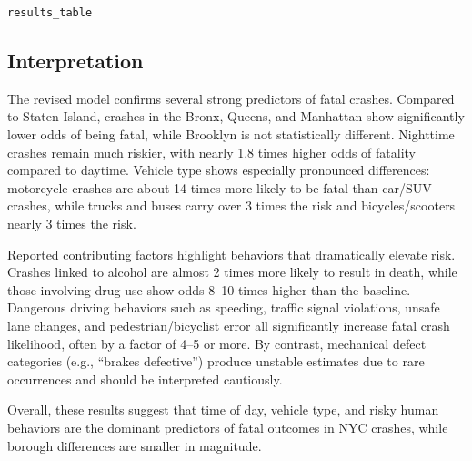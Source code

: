\documentclass[10pt]{article}\usepackage[]{graphicx}\usepackage[]{xcolor}
\makeatletter
\newcommand{\hldef}[1]{\textcolor[rgb]{0.345,0.345,0.345}{#1}}%
\newenvironment{kframe}{%
 \def\at@end@of@kframe{}%
 \ifinner\ifhmode%
  \def\at@end@of@kframe{\end{minipage}}%
  \begin{minipage}{\columnwidth}%
 \fi\fi%
 \def\FrameCommand##1{\hskip\@totalleftmargin \hskip-\fboxsep
 \colorbox{shadecolor}{##1}\hskip-\fboxsep
     \hskip-\linewidth \hskip-\@totalleftmargin \hskip\columnwidth}%
 \MakeFramed {\advance\hsize-\width
   \@totalleftmargin\z@ \linewidth\hsize
   \@setminipage}}%
 {\par\unskip\endMakeFramed%
 \at@end@of@kframe}
\newenvironment{knitrout}{}{} %
\makeatother
\begin{document}
\begin{knitrout}
\begin{kframe}
{\ttfamily\noindent\bfseries\color{errorcolor}{\#\# Error: object 'results\_table' not found}}\begin{alltt}
\hldef{results_table}
\end{alltt}


{\ttfamily\noindent\bfseries\color{errorcolor}{\#\# Error: object 'results\_table' not found}}\end{kframe}
\end{knitrout}

\subsection{Interpretation}
The revised model confirms several strong predictors of fatal crashes. Compared to Staten Island, crashes in the Bronx, Queens, and Manhattan show significantly lower odds of being fatal, while Brooklyn is not statistically different. Nighttime crashes remain much riskier, with nearly 1.8 times higher odds of fatality compared to daytime. Vehicle type shows especially pronounced differences: motorcycle crashes are about 14 times more likely to be fatal than car/SUV crashes, while trucks and buses carry over 3 times the risk and bicycles/scooters nearly 3 times the risk.

Reported contributing factors highlight behaviors that dramatically elevate risk. Crashes linked to alcohol are almost 2 times more likely to result in death, while those involving drug use show odds 8–10 times higher than the baseline. Dangerous driving behaviors such as speeding, traffic signal violations, unsafe lane changes, and pedestrian/bicyclist error all significantly increase fatal crash likelihood, often by a factor of 4–5 or more. By contrast, mechanical defect categories (e.g., “brakes defective”) produce unstable estimates due to rare occurrences and should be interpreted cautiously.

Overall, these results suggest that time of day, vehicle type, and risky human behaviors are the dominant predictors of fatal outcomes in NYC crashes, while borough differences are smaller in magnitude.
\end{document}
